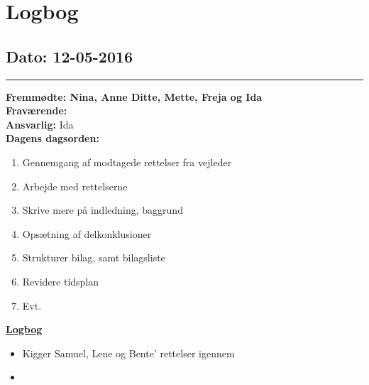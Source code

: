 \chapter{Logbog}
\section{Dato: 12-05-2016}
\hrule
\textbf{Fremmødte: Nina, Anne Ditte, Mette, Freja og Ida} \\
\textbf{Fraværende: } \\
\textbf{Ansvarlig: } Ida  \\
\textbf{Dagens dagsorden: }
\begin{enumerate}
\item Gennemgang af modtagede rettelser fra vejleder
\item Arbejde med rettelserne
\item Skrive mere på indledning, baggrund
\item Opsætning af delkonklusioner
\item Strukturer bilag, samt bilagsliste
\item Revidere tidsplan
\item Evt. 
\end{enumerate}

\underline{\textbf{Logbog}}\\
\begin{itemize}
\item Kigger Samuel, Lene og Bente' rettelser igennem
\item 
\end{itemize}